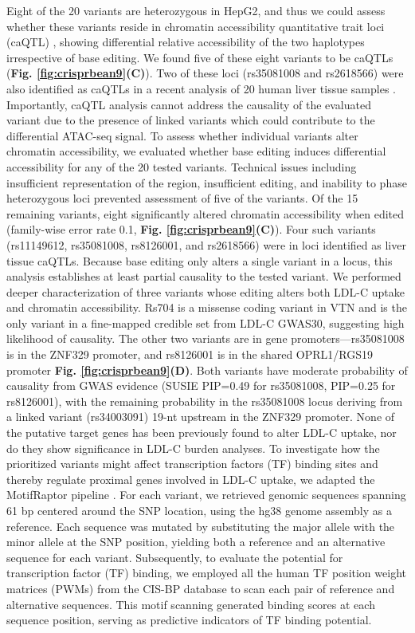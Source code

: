 \documentclass[a4paper, titlepage, openright]{book}
\begin{document}
Eight of the 20 variants are heterozygous in HepG2, and thus we could assess whether these variants reside in chromatin accessibility quantitative trait loci (caQTL) \citep{degner2012dnase}, showing differential relative accessibility of the two haplotypes irrespective of base editing. We found five of these eight variants to be caQTLs (\textbf{Fig. \ref{fig:crisprbean9}(C)}). Two of these loci (rs35081008 and rs2618566) were also identified as caQTLs in a recent analysis of 20 human liver tissue samples \citep{currin2021genetic}. Importantly, caQTL analysis cannot address the causality of the evaluated variant due to the presence of linked variants which could contribute to the differential ATAC-seq signal. To assess whether individual variants alter chromatin accessibility, we evaluated whether base editing induces differential accessibility for any of the 20 tested variants. Technical issues including insufficient representation of the region, insufficient editing, and inability to phase heterozygous loci prevented assessment of five of the variants. Of the 15 remaining variants, eight significantly altered chromatin accessibility when edited (family-wise error rate 0.1, \textbf{Fig. \ref{fig:crisprbean9}(C)}). Four such variants (rs11149612, rs35081008, rs8126001, and rs2618566) were in loci identified as liver tissue caQTLs. Because base editing only alters a single variant in a locus, this analysis establishes at least partial causality to the tested variant. We performed deeper characterization of three variants whose editing alters both LDL-C uptake and chromatin accessibility. Rs704 is a missense coding variant in VTN and is the only variant in a fine-mapped credible set from LDL-C GWAS30, suggesting high likelihood of causality. The other two variants are in gene promoters—rs35081008 is in the ZNF329 promoter, and rs8126001 is in the shared OPRL1/RGS19 promoter \textbf{Fig. \ref{fig:crisprbean9}(D)}. Both variants have moderate probability of causality from GWAS evidence (SUSIE PIP=0.49 for rs35081008, PIP=0.25 for rs8126001), with the remaining probability in the rs35081008 locus deriving from a linked variant (rs34003091) 19-nt upstream in the ZNF329 promoter. None of the putative target genes has been previously found to alter LDL-C uptake, nor do they show significance in LDL-C burden analyses. To investigate how the prioritized variants might affect transcription factors (TF) binding sites and thereby regulate proximal genes involved in LDL-C uptake, we adapted the MotifRaptor pipeline \citep{yao2021motif}. For each variant, we retrieved genomic sequences spanning 61 bp centered around the SNP location, using the hg38 genome assembly as a reference. Each sequence was mutated by substituting the major allele with the minor allele at the SNP position, yielding both a reference and an alternative sequence for each variant. Subsequently, to evaluate the potential for transcription factor (TF) binding, we employed all the human TF position weight matrices (PWMs) from the CIS-BP database \citep{weirauch2014determination} to scan each pair of reference and alternative sequences. This motif scanning generated binding scores at each sequence position, serving as predictive indicators of TF binding potential. 
\end{document}
